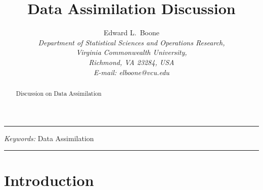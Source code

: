 \documentclass[11pt,twoside]{article}
\numberwithin{equation}{section}
\begin{document}
\title{\large \textbf{Data Assimilation Discussion}}
\author{
\normalsize Edward L.~Boone\\ 
\normalsize \textit{Department of Statistical Sciences and Operations Research,} \\
\normalsize \textit{Virginia Commonwealth University,}\\ 
\normalsize \textit{Richmond, VA 23284, USA}\\ 
\normalsize \textit{E-mail: elboone@vcu.edu} \\[0.1in]
}
\maketitle
\vspace{0.1in}

\hrule
\begin{abstract}
Discussion on Data Assimilation
\end{abstract}
{\em Keywords:} Data Assimilation 
\vspace{0.1in}
\hrule

\section{Introduction}
\label{sect-intro}
\end{document}
